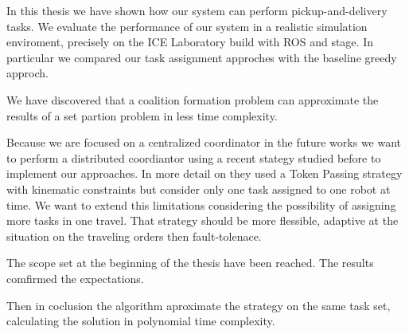 In this thesis we have shown how our system can perform pickup-and-delivery tasks.
We evaluate the performance of our system in a realistic simulation enviroment,
precisely on the ICE Laboratory build with ROS and stage. 
In particular we compared our task assignment approches with the baseline greedy 
approch.

We have discovered that a coalition formation problem can approximate the results 
of a set partion problem in less time complexity.

Because we are focused on a centralized coordinator in the future works we want to 
perform a distributed coordiantor using a recent stategy studied before to implement 
our approaches.
In more detail on \cite{mapd} they used a Token Passing strategy with kinematic 
constraints but consider only one task assigned to one robot at time.
We want to extend this limitations considering the possibility of assigning more 
tasks in one travel.
That strategy should be more flessible, adaptive at the situation on the traveling
orders then fault-tolenace. 

The scope set at the beginning of the thesis have been reached.
The results comfirmed the expectations. 

Then in coclusion the \gsp algorithm aproximate the \sps strategy on the same task set,
calculating the solution in polynomial time complexity.
